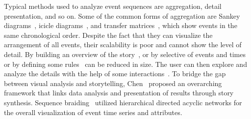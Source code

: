 Typical methods used to analyze event sequences are aggregation, detail presentation, and so on. Some of the common forms of aggregation are Sankey diagrams~\cite{wongsuphasawat_exploring_2012, riehmann_interactive_2005}, icicle diagrams~\cite{monroe_temporal_2013, wongsuphasawat_lifeflow_2011}, and transfer matrices~\cite{yi_timematrix_2010, zhao_matrixwave_2015, bach_visualizing_2014}, which show events in the same chronological order. Despite the fact that they can visualize the arrangement of all events, their scalability is poor and cannot show the level of detail. By building an overview of the story~\cite{perer_frequence_2014, liu_coreflow_2017}, or by selective of events and times~\cite{monroe_temporal_2013, baumgartl_search_2020, guo_visual_2018} or by defining some rules~\cite{zgraggen_s_2015, cappers_exploring_2017} can be reduced in size. The user can then explore and analyze the details with the help of some interactions~\cite{magallanes_sequen-c_2021, pena-araya_hyperstorylines_2022}. To bridge the gap between visual analysis and storytelling, Chen~\cite{chen_supporting_2018} proposed an overarching framework that links data analysis and presentation of results through story synthesis. Sequence braiding~\cite{di_bartolomeo_s_2020} utilized hierarchical directed acyclic networks for the overall visualization of event time series and attributes.

